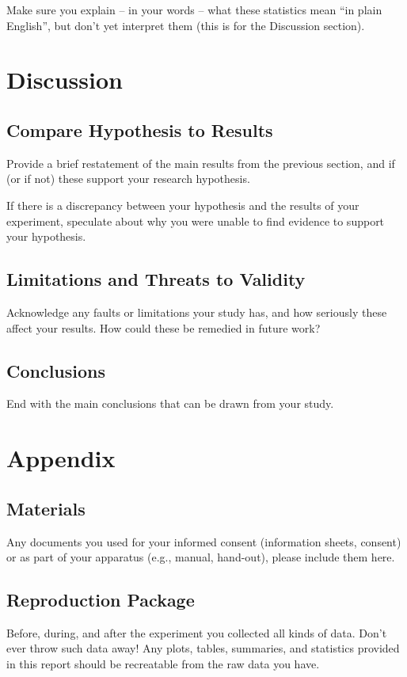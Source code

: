 \documentclass{article}
\begin{document}
Make sure you explain – in your words – what these statistics mean “in plain English”, but don’t yet interpret them (this is for the Discussion section).

\section{Discussion}
\subsection{Compare Hypothesis to Results}
Provide a brief restatement of the main results from the previous section, and if (or if not) these support your research hypothesis.

If there is a discrepancy between your hypothesis and the results of your experiment, speculate about why you were unable to find evidence to support your hypothesis. 


\subsection{Limitations and Threats to Validity}
Acknowledge any faults or limitations your study has, and how seriously these affect your
results. How could these be remedied in future work?

\subsection{Conclusions}
End with the main conclusions that can be drawn from your study.

\section{Appendix}
\subsection{Materials}
Any documents you used for your informed consent (information sheets, consent) or as part of your apparatus (e.g., manual, hand-out), please include them here.

\subsection{Reproduction Package}
Before, during, and after the experiment you collected all kinds of data. Don't ever throw such data away! Any plots, tables, summaries, and statistics provided in this report should be recreatable from the raw data you have.
\end{document}
